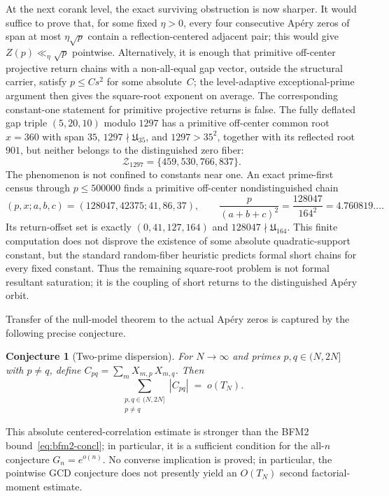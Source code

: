 \documentclass[11pt]{article}
\newtheorem{conjecture}[theorem]{Conjecture}
\theoremstyle{definition}
\theoremstyle{remark}
\begin{document}
At the next corank level, the exact surviving obstruction is now sharper.
It would suffice to prove that, for some fixed $\eta>0$, every four
consecutive Ap\'ery zeros of span at most $\eta\sqrt p$ contain a
reflection-centered adjacent pair; this would give $Z(p)\ll_\eta\sqrt p$
pointwise.  Alternatively, it is enough that primitive off-center projective
return chains with a non-all-equal gap vector, outside the structural carrier,
satisfy $p\le Cs^2$ for some absolute~$C$; the level-adaptive
exceptional-prime argument then gives the square-root exponent on average.
The corresponding constant-one statement for primitive projective returns is
false.  The fully deflated gap triple $(5,20,10)$ modulo
$1297$ has a primitive off-center common root $x=360$ with span $35$,
$1297\nmid\mathfrak U_{35}$, and $1297>35^2$, together with its reflected
root $901$, but neither belongs to
the distinguished zero fiber:
\[
 \mathcal Z_{1297}=\{459,530,766,837\}.
\]
The phenomenon is not confined to constants near one.  An exact prime-first
census through $p\le500000$ finds a primitive off-center nondistinguished
chain
\[
 (p,x;a,b,c)=(128047,42375;41,86,37),
 \qquad \frac{p}{(a+b+c)^2}=\frac{128047}{164^2}=4.760819\ldots.
\]
Its return-offset set is exactly $(0,41,127,164)$ and
$128047\nmid\mathfrak U_{164}$.  This finite computation does not disprove
the existence of some absolute quadratic-support constant, but the standard
random-fiber heuristic predicts formal short chains for every fixed constant.
Thus the remaining square-root problem is not formal resultant saturation;
it is the coupling of short returns to the distinguished Ap\'ery orbit.

Transfer of the null-model theorem
to the actual Ap\'ery zeros
is captured by the following
precise conjecture.

\begin{conjecture}[Two-prime dispersion]
\label{conj:two-prime}
For $N \to \infty$ and primes
$p, q \in (N, 2N]$ with
$p \ne q$, define
$C_{pq} = \sum_m X_{m,p}\,X_{m,q}$.
Then
\[
\sum_{\substack{p,q \in (N,2N] \\
p \ne q}} |C_{pq}|
\;=\; o(T_N).
\]
\end{conjecture}

\noindent
This absolute centered-correlation estimate is stronger than
the BFM2 bound~\eqref{eq:bfm2-concl}; in particular, it is a
sufficient condition for the all-$n$ conjecture
$G_n=e^{o(n)}$.  No converse implication is proved; in particular,
the pointwise GCD conjecture does not presently yield an
$O(T_N)$ second factorial-moment estimate.
\end{document}
